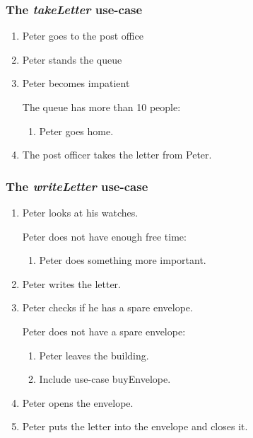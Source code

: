 \subsubsection{The \emph{takeLetter} use-case}
\begin{enumerate}
 \item Peter goes to the post office
 \item Peter stands the queue
 \item Peter becomes impatient

 The queue has more than 10 people:
 \begin{enumerate}
  \item Peter goes home.
 \end{enumerate}


 \item The post officer takes the letter from Peter.
\end{enumerate}


\subsubsection{The \emph{writeLetter} use-case}
\begin{enumerate}

 \item Peter looks at his watches.

    Peter does not have enough free time:
    \begin {enumerate}
      \item Peter does something more important.
    \end {enumerate}

 \item Peter writes the letter.

 \item Peter checks if he has a spare envelope.
    
    Peter does not have a spare envelope:
    \begin {enumerate}
      \item Peter leaves the building.
      \item Include use-case buyEnvelope.
    \end {enumerate}

 \item Peter opens the envelope.

 \item Peter puts the letter into the envelope and closes it.
\end{enumerate}


